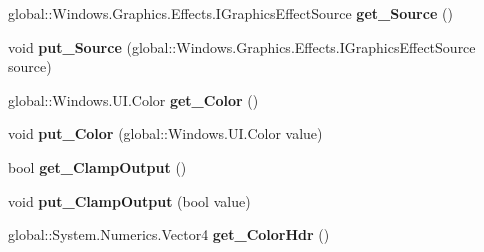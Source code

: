 \begin{DoxyCompactItemize}
\item 
\mbox{\label{interface_microsoft_1_1_graphics_1_1_canvas_1_1_effects_1_1_i_tint_effect_aaf0626b4108a593e2255ee54368f6526}} 
global\+::\+Windows.\+Graphics.\+Effects.\+I\+Graphics\+Effect\+Source {\bfseries get\+\_\+\+Source} ()
\item 
\mbox{\label{interface_microsoft_1_1_graphics_1_1_canvas_1_1_effects_1_1_i_tint_effect_a956f6e4a96e8243eaea0b5c74184238f}} 
void {\bfseries put\+\_\+\+Source} (global\+::\+Windows.\+Graphics.\+Effects.\+I\+Graphics\+Effect\+Source source)
\item 
\mbox{\label{interface_microsoft_1_1_graphics_1_1_canvas_1_1_effects_1_1_i_tint_effect_a9740906fbd4edf788c38a4ffe4f56c9f}} 
global\+::\+Windows.\+U\+I.\+Color {\bfseries get\+\_\+\+Color} ()
\item 
\mbox{\label{interface_microsoft_1_1_graphics_1_1_canvas_1_1_effects_1_1_i_tint_effect_a9a8048767dbe8e55365b0088713b81aa}} 
void {\bfseries put\+\_\+\+Color} (global\+::\+Windows.\+U\+I.\+Color value)
\item 
\mbox{\label{interface_microsoft_1_1_graphics_1_1_canvas_1_1_effects_1_1_i_tint_effect_a4cac70c0257b0afafba73f50651187dc}} 
bool {\bfseries get\+\_\+\+Clamp\+Output} ()
\item 
\mbox{\label{interface_microsoft_1_1_graphics_1_1_canvas_1_1_effects_1_1_i_tint_effect_ae2e523533c05f903031fbbb09375c030}} 
void {\bfseries put\+\_\+\+Clamp\+Output} (bool value)
\item 
\mbox{\label{interface_microsoft_1_1_graphics_1_1_canvas_1_1_effects_1_1_i_tint_effect_afb63c71fa3347d9d70b3a6af7f2c05f0}} 
global\+::\+System.\+Numerics.\+Vector4 {\bfseries get\+\_\+\+Color\+Hdr} ()
\item 

\end{DoxyCompactItemize}
